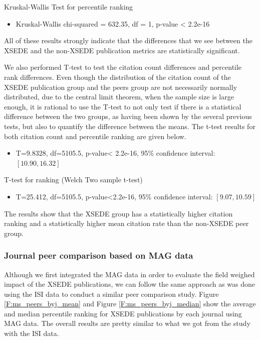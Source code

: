 \documentclass{sig-alternate}
\begin{document}
Kruskal-Wallis Test for percentile ranking
\begin{itemize}
\item Kruskal-Wallis chi-squared = 632.35, df = 1, p-value < 2.2e-16
\end{itemize}

All of these results strongly indicate that the differences that we
see between the XSEDE and the non-XSEDE publication metrics are
statistically significant.

We also performed T-test to test the
citation count differences and percentile rank differences. Even though the
distribution of the citation count of the XSEDE publication group and
the peers group are not necessarily normally distributed, due to the
central limit theorem, when the sample size is large enough, it is
rational to use the T-test to not only test if there is a statistical
difference between the two groups, as having been shown by the several
previous tests, but also to quantify the difference between the
means. The t-test results for both citation count and percentile
ranking are given below.

\begin{itemize}
\item T=9.8328, df=5105.5, p-value< 2.2e-16, 95\% confidence interval: $[10.90, 16.32]$
\end{itemize}

T-test for ranking (Welch Two sample t-test)
\begin{itemize}
\item T=25.412, df=5105.5, p-value<2.2e-16, 95\% confidence interval: $[9.07, 10.59]$
\end{itemize}


The results show that the XSEDE group has a statistically higher
citation ranking and a statistically higher mean citation rate than
the non-XSEDE peer group.

\subsubsection{Journal peer comparison based on MAG data}

Although we first integrated the MAG data in order to evaluate the
field weighed impact of the XSEDE publications, we can follow the same
approach as was done using the ISI data to conduct a similar peer
comparison study. Figure \ref{F:ms_peers_byj_mean} and Figure
\ref{F:ms_peers_byj_median} show the average and median percentile
ranking for XSEDE publications by each journal using MAG data. The
overall results are pretty similar to what we got from the study with
the ISI data.
\end{document}
